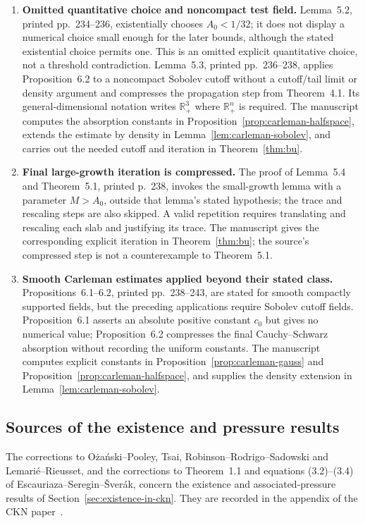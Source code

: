 \documentclass[11pt,letterpaper]{article}
\numberwithin{equation}{section}
\theoremstyle{plain}
\theoremstyle{definition}
\theoremstyle{remark}
\begin{document}
\begin{enumerate}
\item \textbf{Omitted quantitative choice and noncompact test field.} Lemma~5.2, printed pp.~234--236, existentially chooses \(A_0<1/32\); it does not display a numerical choice small enough for the later bounds, although the stated existential choice permits one. This is an omitted explicit quantitative choice, not a threshold contradiction. Lemma~5.3, printed pp.~236--238, applies Proposition~6.2 to a noncompact Sobolev cutoff without a cutoff/tail limit or density argument and compresses the propagation step from Theorem~4.1. Its general-dimensional notation writes \(\mathbb R^3_+\) where \(\mathbb R^n_+\) is required. The manuscript computes the absorption constants in Proposition~\ref{prop:carleman-halfspace}, extends the estimate by density in Lemma~\ref{lem:carleman-sobolev}, and carries out the needed cutoff and iteration in Theorem~\ref{thm:bu}.

\item \textbf{Final large-growth iteration is compressed.} The proof of Lemma~5.4 and Theorem~5.1, printed p.~238, invokes the small-growth lemma with a parameter \(M>A_0\), outside that lemma's stated hypothesis; the trace and rescaling steps are also skipped. A valid repetition requires translating and rescaling each slab and justifying its trace. The manuscript gives the corresponding explicit iteration in Theorem~\ref{thm:bu}; the source's compressed step is not a counterexample to Theorem~5.1.

\item \textbf{Smooth Carleman estimates applied beyond their stated class.} Propositions~6.1--6.2, printed pp.~238--243, are stated for smooth compactly supported fields, but the preceding applications require Sobolev cutoff fields. Proposition~6.1 asserts an absolute positive constant \(c_0\) but gives no numerical value; Proposition~6.2 compresses the final Cauchy--Schwarz absorption without recording the uniform constants. The manuscript computes explicit constants in Proposition~\ref{prop:carleman-gauss} and Proposition~\ref{prop:carleman-halfspace}, and supplies the density extension in Lemma~\ref{lem:carleman-sobolev}.
\end{enumerate}

\subsection*{Sources of the existence and pressure results}

The corrections to Ożański--Pooley, Tsai, Robinson--Rodrigo--Sadowski and Lemarié--Rieusset, and the corrections to Theorem~1.1 and equations (3.2)--(3.4) of Escauriaza--Seregin--\v{S}ver\'ak, concern the existence and associated-pressure results of Section~\ref{sec:existence-in-ckn}. They are recorded in the appendix of the CKN paper~\cite{CKNLean}.
\end{document}
